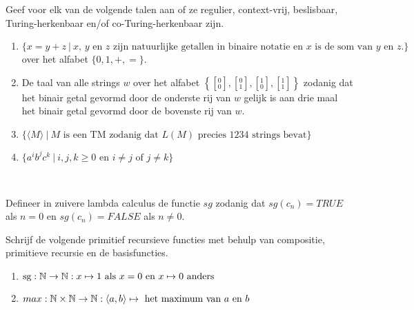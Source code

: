 \documentclass[a4paper]{article}
\newcommand{\twar}[2]{\left[ { }^{#1}_{#2} \right] }
\begin{document}
\begin{question}
Geef voor elk van de volgende talen aan of ze regulier, context-vrij, beslisbaar, Turing-herkenbaar en/of co-Turing-herkenbaar zijn.
\begin{enumerate}
  \item $\{ x = y+z \  | \ \text{$x$, $y$ en $z$ zijn natuurlijke getallen in binaire notatie en $x$ is de som van $y$ en $z$.} \}$ over het alfabet $\{0,1,+,=\}$.
  \item De taal van alle strings $w$ over het alfabet $\left\{ \twar{0}{0}, \twar{0}{1}, \twar{1}{0}, \twar{1}{1} \right\}$ zodanig dat het binair getal gevormd door de onderste rij van $w$ gelijk is aan drie maal het binair getal gevormd door de bovenste rij van $w$. 
  \item $\{ \langle M \rangle \ | \ \text{$M$ is een TM zodanig dat $L(M)$ precies 1234 strings bevat} \}$ %
  \item $\{ a^ib^jc^k \ | \ \text{$i,j,k \geq 0$ en $i \neq j$ of $j \neq k$} \}$ 
\end{enumerate}
\begin{answer}~~
\end{answer}
\end{question}

\begin{question}
Defineer in zuivere lambda calculus de functie $sg$ zodanig dat $sg(c_n) = TRUE$ als $n = 0$ en $sg(c_n) = FALSE$ als $n \neq 0$.
\begin{answer}

\end{answer}
\end{question}

\begin{question}
Schrijf de volgende primitief recursieve functies met behulp van compositie, primitieve recursie en de basisfuncties.
\begin{enumerate}
  \item $\mbox{sg}:\mathbb{N}\to\mathbb{N}:x\mapsto1\text{ als $x = 0$ en $x \mapsto 0$ anders}$
  \item $max:\mathbb{N} \times \mathbb{N}\to\mathbb{N}:\left\langle a,b \right\rangle\mapsto\text{ het maximum van $a$ en $b$}$
\end{enumerate}
\begin{answer}

\end{answer}
\end{question}
\end{document}
